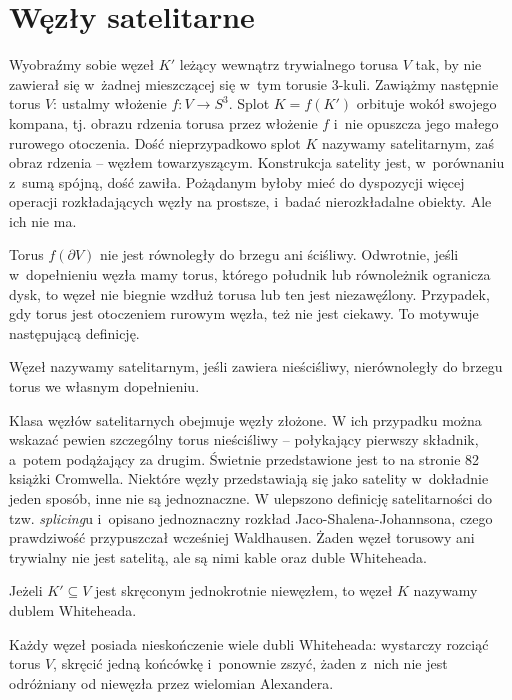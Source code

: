 \section{Węzły satelitarne} %
\label{sec:satellite}
Wyobraźmy sobie węzeł $K'$ leżący wewnątrz trywialnego torusa $V$ tak, by nie zawierał się w~żadnej mieszczącej się w~tym torusie 3-kuli.
Zawiążmy następnie torus $V$: ustalmy włożenie $f \colon V \to S^3$.
Splot $K = f(K')$ orbituje wokół swojego kompana, tj. obrazu rdzenia torusa przez włożenie $f$ i~nie opuszcza jego małego rurowego otoczenia.
Dość nieprzypadkowo splot $K$ nazywamy satelitarnym, zaś obraz rdzenia -- węzłem towarzyszącym.
Konstrukcja satelity jest, w~porównaniu z~sumą spójną, dość zawiła.
Pożądanym byłoby mieć do dyspozycji więcej operacji rozkładających węzły na prostsze, i~badać nierozkładalne obiekty.
Ale ich nie ma.

Torus $f(\partial V)$ nie jest równoległy do brzegu ani ściśliwy.
Odwrotnie, jeśli w~dopełnieniu węzła mamy torus, którego południk lub równoleżnik ogranicza dysk, to węzeł nie biegnie wzdłuż torusa lub ten jest niezawęźlony.
Przypadek, gdy torus jest otoczeniem rurowym węzła, też nie jest ciekawy.
To motywuje następującą definicję.

\begin{definition}
	Węzeł nazywamy satelitarnym, jeśli zawiera nieściśliwy, nierównoległy do brzegu torus we własnym dopełnieniu.
\end{definition}

Klasa węzłów satelitarnych obejmuje węzły złożone.
W ich przypadku można wskazać pewien szczególny torus nieściśliwy -- połykający pierwszy składnik, a~potem podążający za drugim.
Świetnie przedstawione jest to na stronie 82 książki \cite{cromwell04} Cromwella.
Niektóre węzły przedstawiają się jako satelity w~dokładnie jeden sposób, inne nie są jednoznaczne.
W \cite{jaco79} ulepszono definicję satelitarności do tzw. \emph{splicing}u i~opisano jednoznaczny rozkład Jaco-Shalena-Johannsona, czego prawdziwość przypuszczał wcześniej Waldhausen.
Żaden węzeł torusowy ani trywialny nie jest satelitą, ale są nimi kable oraz duble Whiteheada.

\begin{definition}
	Jeżeli $K' \subseteq V$ jest skręconym jednokrotnie niewęzłem, to węzeł $K$ nazywamy dublem Whiteheada.
\end{definition}

Każdy węzeł posiada nieskończenie wiele dubli Whiteheada: wystarczy rozciąć torus $V$, skręcić jedną końcówkę i~ponownie zszyć, żaden z~nich nie jest odróżniany od niewęzła przez wielomian Alexandera.


